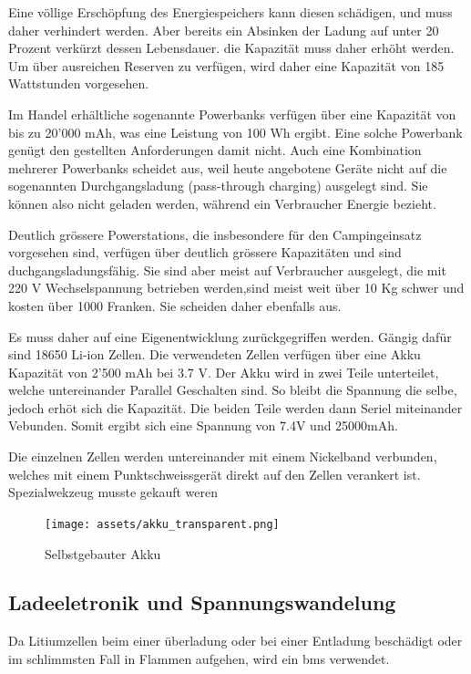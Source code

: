 Eine völlige Erschöpfung des Energiespeichers kann diesen schädigen, und muss daher verhindert werden. Aber bereits ein Absinken der Ladung auf unter 20 Prozent verkürzt dessen Lebensdauer. die Kapazität muss daher erhöht werden. Um über ausreichen Reserven zu verfügen, wird daher eine Kapazität von 185 Wattstunden vorgesehen.

Im Handel erhältliche sogenannte Powerbanks verfügen über eine Kapazität von bis zu 20'000 mAh, was eine Leistung von 100 Wh ergibt. Eine solche Powerbank genügt den gestellten Anforderungen damit nicht. Auch eine Kombination mehrerer Powerbanks scheidet aus, weil heute angebotene Geräte nicht auf die sogenannten Durchgangsladung (pass‐through charging) ausgelegt sind. Sie können also nicht geladen werden, während ein Verbraucher Energie bezieht.  

Deutlich grössere Powerstations, die insbesondere für den Campingeinsatz vorgesehen sind, verfügen über deutlich grössere Kapazitäten und sind duchgangsladungsfähig. Sie sind aber meist auf Verbraucher ausgelegt, die mit 220 V Wechselspannung betrieben werden,sind meist weit über 10 Kg schwer und kosten über 1000 Franken. Sie scheiden daher ebenfalls aus.   

Es muss daher auf eine Eigenentwicklung zurückgegriffen werden. Gängig dafür sind 18650 Li-ion Zellen. Die verwendeten Zellen verfügen über eine Akku Kapazität von 2'500 mAh bei 3.7 V. 
Der Akku wird in zwei Teile unterteilet, welche untereinander Parallel Geschalten sind. So bleibt die Spannung die selbe, jedoch erhöt sich die Kapazität. Die beiden Teile werden dann Seriel miteinander Vebunden. Somit ergibt sich eine Spannung von 7.4V und 25000mAh. 

Die einzelnen Zellen werden untereinander mit einem Nickelband verbunden, welches mit einem Punktschweissgerät direkt auf den Zellen verankert ist. Spezialwekzeug musste gekauft weren




\begin{figure}[H]
    \centering
    \texttt{[image: assets/akku\_transparent.png]}
    \caption{Selbstgebauter Akku}
    \label{fig:enter-label}
\end{figure}


\subsection{Ladeeletronik und Spannungswandelung}

Da Litiumzellen beim einer überladung oder bei einer Entladung beschädigt oder im schlimmsten Fall in Flammen aufgehen, wird ein \ac{bms} verwendet. 

